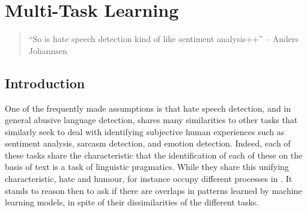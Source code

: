 \ifpdf
    \graphicspath{{Chapter5/Figs/Raster/}{Chapter5/Figs/PDF/}{Chapter5/Figs/}}
\else
    \graphicspath{{Chapter5/Figs/Vector/}{Chapter5/Figs/}}
\fi

\chapter{Multi-Task Learning}\label{chap:mtl}

\begin{quote}
  ``So is hate speech detection kind of like sentiment analysis++'' -- Anders Johannsen
\end{quote}

\section{Introduction}
One of the frequently made assumptions is that hate speech detection, and in general abusive language detection, shares many similarities to other tasks that similarly seek to deal with identifying subjective human experiences such as sentiment analysis, sarcasm detection, and emotion detection. Indeed, each of these tasks share the characteristic that the identification of each of these on the basis of text is a task of linguistic pragmatics. While they share this unifying characteristic, hate and humour, for instance occupy different processes in  \cite{CITE: Cite papers that find things about humour and hate}. It stands to reason then to ask if there are overlaps in patterns learned by machine learning models, in spite of their dissimilarities of the different tasks.

